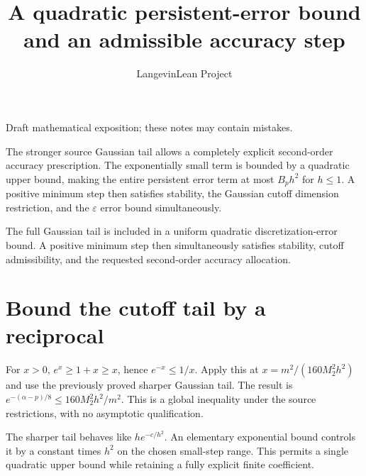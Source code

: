 \documentclass[11pt,a4paper]{article}
\title{\texorpdfstring{A quadratic persistent-error bound and an admissible accuracy step}{A quadratic persistent-error bound and an admissible accuracy step}}
\author{LangevinLean Project}
\date{}
\begin{document}
\maketitle
Draft mathematical exposition; these notes may contain mistakes.


The stronger source Gaussian tail allows a completely explicit second-order accuracy prescription. The exponentially small term is bounded by a quadratic upper bound, making the entire persistent error term at most \(B_p h^2\) for \(h\le1\). A positive minimum step then satisfies stability, the Gaussian cutoff dimension restriction, and the \(\varepsilon\) error bound simultaneously.



The full Gaussian tail is included in a uniform quadratic discretization-error bound. A positive minimum step then simultaneously satisfies stability, cutoff admissibility, and the requested second-order accuracy allocation.


\section{\texorpdfstring{Bound the cutoff tail by a reciprocal}{Bound the cutoff tail by a reciprocal}}


For \(x>0\), \(e^x\ge1+x\ge x\), hence \(e^{-x}\le1/x\). Apply this at \(x=m^2/(160M_2^2h^2)\) and use the previously proved sharper Gaussian tail. The result is \(e^{-(\alpha-p)/8}\le160M_2^2h^2/m^2\). This is a global inequality under the source restrictions, with no asymptotic qualification.



The sharper tail behaves like \(h e^{-c/h^2}\). An elementary exponential bound controls it by a constant times \(h^2\) on the chosen small-step range. This permits a single quadratic upper bound while retaining a fully explicit finite coefficient.
\end{document}
